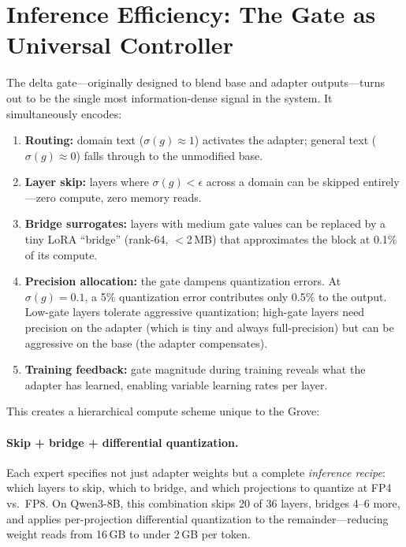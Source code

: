 \documentclass[11pt]{article}
\begin{document}
\section{Inference Efficiency: The Gate as Universal Controller}

The delta gate---originally designed to blend base and adapter
outputs---turns out to be the single most information-dense signal in
the system. It simultaneously encodes:

\begin{enumerate}[nosep]
\item \textbf{Routing:} domain text ($\sigma(g) \approx 1$) activates the
      adapter; general text ($\sigma(g) \approx 0$) falls through to the
      unmodified base.
\item \textbf{Layer skip:} layers where $\sigma(g) < \epsilon$ across a domain
      can be skipped entirely---zero compute, zero memory reads.
\item \textbf{Bridge surrogates:} layers with medium gate values can be
      replaced by a tiny LoRA ``bridge'' (rank-64, $<$2\,MB) that
      approximates the block at 0.1\% of its compute.
\item \textbf{Precision allocation:} the gate dampens quantization errors.
      At $\sigma(g) = 0.1$, a 5\% quantization error contributes only 0.5\%
      to the output. Low-gate layers tolerate aggressive quantization;
      high-gate layers need precision on the adapter (which is tiny and
      always full-precision) but can be aggressive on the base (the adapter
      compensates).
\item \textbf{Training feedback:} gate magnitude during training reveals
      what the adapter has learned, enabling variable learning rates per layer.
\end{enumerate}

This creates a hierarchical compute scheme unique to the Grove:

\paragraph{Skip + bridge + differential quantization.}
Each expert specifies not just adapter weights but a complete
\emph{inference recipe}: which layers to skip, which to bridge, and
which projections to quantize at FP4 vs.\ FP8. On Qwen3-8B, this
combination skips 20 of 36 layers, bridges 4--6 more, and applies
per-projection differential quantization to the remainder---reducing
weight reads from 16\,GB to under 2\,GB per token.
\end{document}
